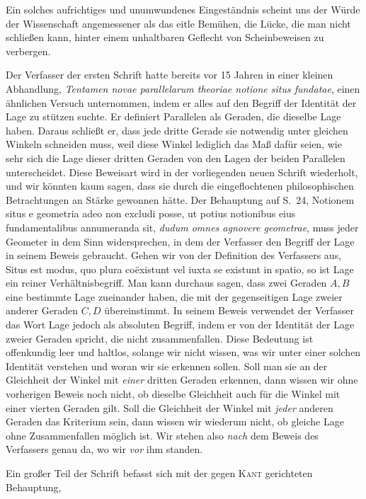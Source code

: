 %
Ein solches aufrichtiges und unumwundenes Eingeständnis scheint uns der Würde der Wissenschaft angemessener als das eitle Bemühen, die Lücke, die man nicht schließen kann, hinter einem unhaltbaren Geflecht von Scheinbeweisen zu verbergen.

Der Verfasser der ersten Schrift hatte bereits vor 15 Jahren in einer kleinen Abhandlung, \textit{Tentamen novae parallelarum theoriae notione situs fundatae}, einen ähnlichen Versuch unternommen, indem er alles auf den Begriff der Identität der Lage zu stützen suchte. Er definiert Parallelen als Geraden, die dieselbe Lage haben. Daraus schließt er, dass jede dritte Gerade sie notwendig unter gleichen Winkeln schneiden muss, weil diese Winkel lediglich das Maß dafür seien, wie sehr sich die Lage dieser dritten Geraden von den Lagen der beiden Parallelen unterscheidet. Diese Beweisart wird in der vorliegenden neuen Schrift wiederholt, und wir könnten kaum sagen, dass sie durch die eingeflochtenen philosophischen Betrachtungen an Stärke gewonnen hätte. Der Behauptung auf S.~24, Notionem situs e geometria adeo non excludi posse, ut potius notionibus eius fundamentalibus annumeranda sit, \textit{dudum omnes agnovere geometrae}, muss jeder Geometer in dem Sinn widersprechen, in dem der Verfasser den Begriff der Lage in seinem Beweis gebraucht. Gehen wir von der Definition des Verfassers aus, Situs est modus, quo plura coëxistunt vel iuxta se existunt in spatio, so ist Lage ein reiner Verhältnisbegriff. Man kann durchaus sagen, dass zwei Geraden \(A,B\) eine bestimmte Lage zueinander haben, die mit der gegenseitigen Lage zweier anderer Geraden \(C,D\) übereinstimmt. In seinem Beweis verwendet der Verfasser das Wort Lage jedoch als absoluten Begriff, indem er von der Identität der Lage zweier Geraden spricht, die nicht zusammenfallen. Diese Bedeutung ist offenkundig leer und haltlos, solange wir nicht wissen, was wir unter einer solchen Identität verstehen und woran wir sie erkennen sollen. Soll man sie an der Gleichheit der Winkel mit \textit{einer} dritten Geraden erkennen, dann wissen wir ohne vorherigen Beweis noch nicht, ob dieselbe Gleichheit auch für die Winkel mit einer vierten Geraden gilt. Soll die Gleichheit der Winkel mit \textit{jeder} anderen Geraden das Kriterium sein, dann wissen wir wiederum nicht, ob gleiche Lage ohne Zusammenfallen möglich ist. Wir stehen also \textit{nach} dem Beweis des Verfassers genau da, wo wir \textit{vor} ihm standen.

Ein großer Teil der Schrift befasst sich mit der gegen \textsc{Kant} gerichteten Behauptung,
